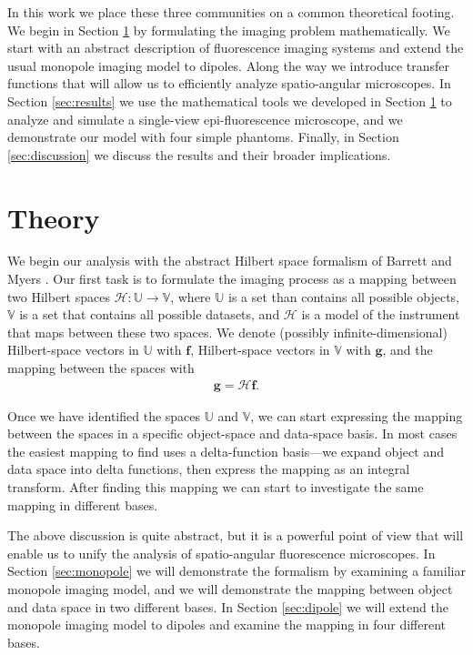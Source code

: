 \documentclass[]{osa-article}
\providecommand{\mb}[1]{\mathbf{#1}}
\providecommand{\mc}[1]{\mathcal{#1}}
\providecommand{\mbb}[1]{\mathbb{#1}}
\begin{document}
In this work we place these three communities on a common theoretical footing.
We begin in Section \ref{sec:theory} by formulating the imaging problem
mathematically. We start with an abstract description of fluorescence imaging
systems and extend the usual monopole imaging model to dipoles. Along the way we
introduce transfer functions that will allow us to efficiently analyze
spatio-angular microscopes. In Section \ref{sec:results} we use the mathematical
tools we developed in Section \ref{sec:theory} to analyze and simulate a
single-view epi-fluorescence microscope, and we demonstrate our model with four
simple phantoms. Finally, in Section \ref{sec:discussion} we discuss the results
and their broader implications.

\section{Theory}\label{sec:theory}
We begin our analysis with the abstract Hilbert space formalism of Barrett and
Myers \cite{barrett2004}. Our first task is to formulate the imaging process as
a mapping between two Hilbert spaces $\mc{H}: \mbb{U} \rightarrow \mbb{V}$, where
$\mbb{U}$ is a set than contains all possible objects, $\mbb{V}$ is a set that
contains all possible datasets, and $\mc{H}$ is a model of the instrument that
maps between these two spaces. We denote (possibly infinite-dimensional)
Hilbert-space vectors in $\mbb{U}$ with $\mb{f}$, Hilbert-space vectors in
$\mbb{V}$ with $\mb{g}$, and the mapping between the spaces with
\begin{align}
  \mb{g} = \mc{H}\mb{f}.
\end{align}

Once we have identified the spaces $\mbb{U}$ and $\mbb{V}$, we can start
expressing the mapping between the spaces in a specific object-space and
data-space basis. In most cases the easiest mapping to find uses a
delta-function basis---we expand object and data space into delta functions,
then express the mapping as an integral transform. After finding this mapping we
can start to investigate the same mapping in different bases.

The above discussion is quite abstract, but it is a powerful point of view that
will enable us to unify the analysis of spatio-angular fluorescence microscopes.
In Section \ref{sec:monopole} we will demonstrate the formalism by examining a
familiar monopole imaging model, and we will demonstrate the mapping between
object and data space in two different bases. In Section \ref{sec:dipole} we
will extend the monopole imaging model to dipoles and examine the mapping in
four different bases.
\end{document}
